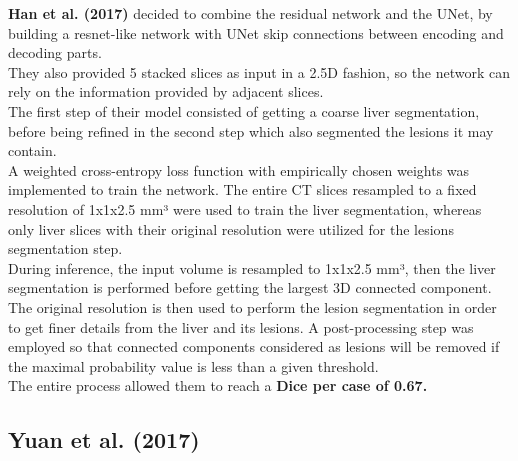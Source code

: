 \textbf{Han et al. (2017)} decided to combine the residual network and
the UNet, by building a resnet-like network with UNet skip connections
between encoding and decoding parts.\\
They also provided 5 stacked slices as input in a 2.5D fashion, so the
network can rely on the information provided by adjacent slices.\\
The first step of their model consisted of getting a coarse liver
segmentation, before being refined in the second step which also
segmented the lesions it may contain.\\
A weighted cross-entropy loss function with empirically chosen weights
was implemented to train the network. The entire CT slices resampled to
a fixed resolution of 1x1x2.5 mm³ were used to train the liver
segmentation, whereas only liver slices with their original resolution
were utilized for the lesions segmentation step.\\
During inference, the input volume is resampled to 1x1x2.5 mm³, then the
liver segmentation is performed before getting the largest 3D connected
component. The original resolution is then used to perform the lesion
segmentation in order to get finer details from the liver and its
lesions. A post-processing step was employed so that connected
components considered as lesions will be removed if the maximal
probability value is less than a given threshold.\\
The entire process allowed them to reach a \textbf{Dice per case of
0.67.}

\subsection{Yuan et al. (2017)}\label{yuan-et-al.-2017}

